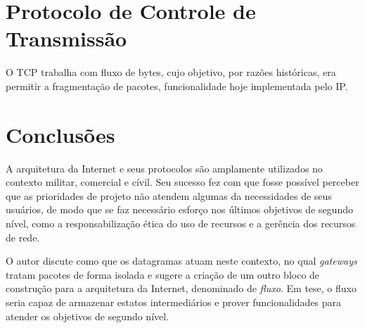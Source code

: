 \section*{Protocolo de Controle de Transmissão}

O TCP trabalha com fluxo de bytes, cujo objetivo, por razões históricas, era permitir a fragmentação de pacotes, funcionalidade hoje implementada pelo IP.


\section*{Conclusões}

A arquitetura da Internet e seus protocolos são amplamente utilizados no contexto militar, comercial e cívil. Seu sucesso fez com que fosse possível perceber que as prioridades de projeto não atendem algumas da necessidades de seus usuários, de modo que se faz necessário esforço nos últimos objetivos de segundo nível, como a responsabilização ética do uso de recursos e a gerência dos recursos de rede.

O autor discute como que os datagramas atuam neste contexto, no qual \textit{gateways} tratam pacotes de forma isolada e sugere a criação de um outro bloco de construção para a arquitetura da Internet, denominado de \emph{fluxo}. Em tese, o fluxo seria capaz de armazenar estatos intermediários e prover funcionalidades para atender os objetivos de segundo nível.
